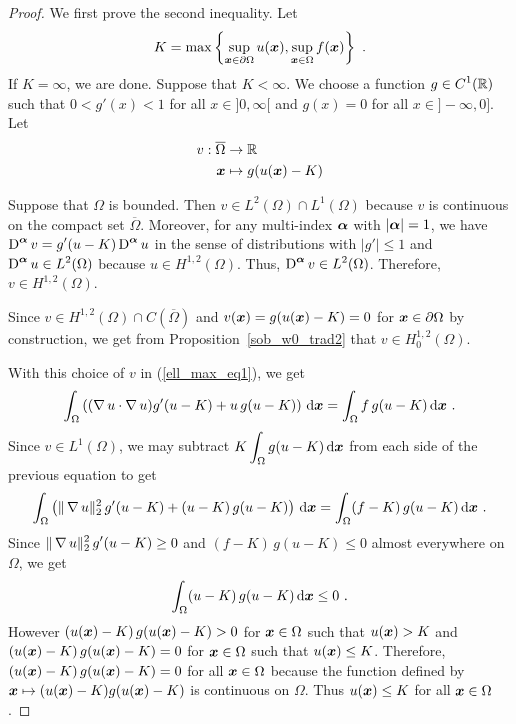 \begin{proof}
 We first prove the second inequality.  Let
\[
K = \max\left\{ \sup_{{\bm{x}}\in \partial \Omega} u({\bm{x}}),
\sup_{{\bm{x}}\in \Omega} f({\bm{x}}) \right\} \ .
\]
If $K=\infty$, we are done.  Suppose that $K<\infty$.
We choose a function $\displaystyle g\in C^1(\mathbb{R})$ such that
$0< g'(x) < 1$ for all $x\in ]0,\infty[$ and $g(x)=0$ for all
$x\in]-\infty,0]$.  Let
\begin{align*}
v: \overline{\Omega} & \rightarrow \mathbb{R} \\
{\bm{x}} &\mapsto g(u({\bm{x}})-K)
\end{align*}

Suppose that $\Omega$ is bounded.  Then
$\displaystyle v \in L^2(\Omega) \cap L^1(\Omega)$ because
$v$ is continuous on the compact set $\overline{\Omega}$.  Moreover,
for any multi-index ${\bm{\alpha}}$ with $|{\bm{\alpha}}|=1$, we have
$\displaystyle \operatorname{D}^{{\bm{\alpha}}} v = g'(u-K) \operatorname{D}^{{\bm{\alpha}}} u$
in the sense of distributions with $|g'|\leq 1$ and
$\displaystyle \operatorname{D}^{{\bm{\alpha}}} u\in L^2(\Omega)$
because $\displaystyle u \in H^{1,2}(\Omega)$.  Thus,
$\displaystyle \operatorname{D}^{{\bm{\alpha}}} v \in L^2(\Omega)$.
Therefore, $\displaystyle v\in H^{1,2}(\Omega)$.

Since $\displaystyle v\in H^{1,2}(\Omega) \cap C(\overline{\Omega})$ and
$v({\bm{x}}) = g(u({\bm{x}})-K) = 0$ for ${\bm{x}}\in \partial \Omega$ by
construction, we get from Proposition~\ref{sob_w0_trad2} that
$\displaystyle v\in H^{1,2}_0(\Omega)$.

With this choice of $v$ in (\ref{ell_max_eq1}), we get
\[
\int_\Omega \left( (\operatorname{\nabla} u \cdot \operatorname{\nabla} u ) g'(u-K) 
+ u \, g(u-K) \right) \,\mathrm{d}{{\bm{x}}} = \int_\Omega f\,g(u-K)
\,\mathrm{d}{{\bm{x}}} \ .
\]
Since $\displaystyle v \in L^1(\Omega)$, we may subtract
$\displaystyle K \int_{\Omega} g(u-K) \,\mathrm{d}{{\bm{x}}}$ from each side of
the previous equation to get
\[
\int_\Omega \left( \|\operatorname{\nabla} u \|_2^2\, g'(u-K) 
+ (u-K) \, g(u-K) \right) \,\mathrm{d}{{\bm{x}}} = \int_\Omega (f-K)\,g(u-K)
\,\mathrm{d}{{\bm{x}}} \ .
\]
Since $\displaystyle \|\operatorname{\nabla} u \|_2^2\, g'(u-K)\geq 0$ and
$(f-K) \, g(u-K)\leq 0$ almost everywhere on $\Omega$, we get
\[
\int_\Omega (u-K) \, g(u-K) \,\mathrm{d}{{\bm{x}}} \leq 0 \ .
\]
However $(u({\bm{x}})-K) \, g(u({\bm{x}})-K) > 0$ for
${\bm{x}} \in \Omega$ such that $u({\bm{x}})>K$ and
$(u({\bm{x}})-K) \, g(u({\bm{x}})-K) = 0$ for
${\bm{x}} \in \Omega$ such that $u({\bm{x}})\leq K$.  Therefore,
$(u({\bm{x}})-K) \, g(u({\bm{x}})-K) = 0$ for all ${\bm{x}}\in \Omega$
because the function defined by
${\bm{x}} \mapsto (u({\bm{x}}) - K) g(u({\bm{x}}) -K)$ is
continuous on $\Omega$.
Thus $u({\bm{x}}) \leq K$ for all ${\bm{x}}\in \Omega$.


\end{proof}
